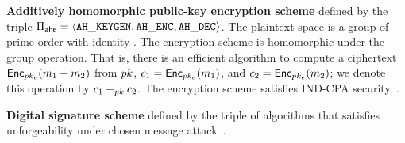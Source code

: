 
\smallskip\noindent\textbf{Additively homomorphic public-key encryption scheme} defined by the triple $\ahencryptionSchemeDefn$.  The plaintext space is a group \group of prime order with identity \groupIdentity. The encryption scheme is
homomorphic under the group operation. That is, there is an efficient
algorithm to compute a ciphertext $\pkencrypt[\encryptPubKey](\plaintext[1] \groupOp \plaintext[2])$
from $\pubKey$, $\ciphertext[1] = \pkencrypt[\encryptPubKey](\plaintext[1])$, and $\ciphertext[2] = \pkencrypt[\encryptPubKey](\plaintext[2])$; we denote this operation by
$\ciphertext[1]\homomorphicAdd{\pubKey} \ciphertext[2]$. The encryption scheme satisfies IND-CPA security~\cite{bellare1998relations}.

\smallskip\noindent\textbf{Digital signature scheme} defined by the triple of algorithms \sigSchemeDefn
that satisfies unforgeability under chosen message attack~\cite{}.
\fi 

